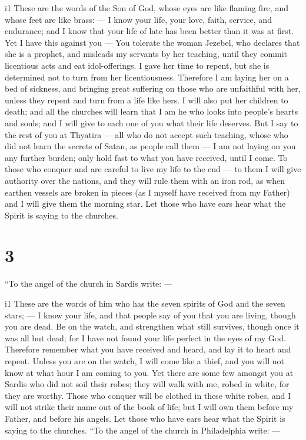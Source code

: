 i1 These are the words of the Son of God, whose eyes are like flaming
fire, and whose feet are like brass: ---  I know your life,
your love, faith, service, and endurance; and I know that your life of
late has been better than it was at first.  Yet I have this
against you --- You tolerate the woman Jezebel, who declares that she is
a prophet, and misleads my servants by her teaching, until they commit
licentious acts and eat idol-offerings.  I gave her time to
repent, but she is determined not to turn from her licentiousness.
 Therefore I am laying her on a bed of sickness, and
bringing great suffering on those who are unfaithful with her, unless
they repent and turn from a life like hers.  I will also
put her children to death; and all the churches will learn that I am he
who looks into people's hearts and souls; and I will give to each one of
you what their life deserves.  But I say to the rest of you
at Thyatira --- all who do not accept such teaching, whose who did not
learn the secrets of Satan, as people call them --- I am not laying on
you any further burden;  only hold fast to what you have
received, until I come.  To those who conquer and are
careful to live my life to the end --- to them I will give authority
over the nations,  and they will rule them with an iron
rod, as when earthen vessels are broken in pieces (as I myself have
received from my Father)  and I will give them the morning
star.  Let those who have ears hear what the Spirit is
saying to the churches.

\hypertarget{section-2}{%
\section{3}\label{section-2}}

 ``To the angel of the church in Sardis write: ---

i1 These are the words of him who has the seven spirits of God and the
seven stars; --- I know your life, and that people say of you that you
are living, though you are dead.  Be on the watch, and
strengthen what still survives, though once it was all but dead; for I
have not found your life perfect in the eyes of my God. 
Therefore remember what you have received and heard, and lay it to heart
and repent. Unless you are on the watch, I will come like a thief, and
you will not know at what hour I am coming to you.  Yet
there are some few amongst you at Sardis who did not soil their robes;
they will walk with me, robed in white, for they are worthy.
 Those who conquer will be clothed in these white robes, and
I will not strike their name out of the book of life; but I will own
them before my Father, and before his angels.  Let those who
have ears hear what the Spirit is saying to the churches. 
``To the angel of the church in Philadelphia write: ---

